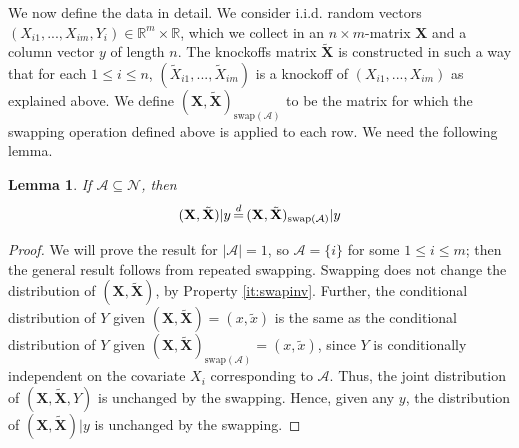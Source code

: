 \documentclass[11pt]{article}
\theoremstyle{plain}
\newtheorem{lemma}[theorem]{Lemma}
\theoremstyle{definition}
\newcommand{\reals}{\mathbb{R}}
\newcommand{\N}{\mathcal{N}}
\newcommand{\A}{\mathcal{A}}
\newcommand{\citt}{\citet}
\begin{document}
 We now define the data in detail. We consider i.i.d. random vectors $(X_{i1},...,X_{im}, Y_i)\in \reals^m\times\reals$, which we collect in an $n\times m$-matrix  $\mathbf{X}$ and a column vector $y$ of length $n$. The knockoffs matrix $\tilde{\mathbf{X}}$ is constructed in such a way that for each $1\leq i \leq n$, 
 $(\tilde{X}_{i1},...,\tilde{X}_{im})$ is a knockoff of $(X_{i1},...,X_{im})$ as explained above.
We define $(\mathbf{X}, \tilde{\mathbf{X}})_{\text{swap}(\A)}$ to be the matrix for which the swapping operation defined above is applied to each row. %
We need the following lemma.
 
 \begin{lemma}\label{lemmaswap}
 If $\A\subseteq\N$, then 
 $$(\mathbf{X}, {\tilde{\mathbf{X}}})|y   \,{\buildrel d \over =}\, (\mathbf{X}, {\tilde{\mathbf{X}}})_{\text{swap}(\A)}|y$$
 \end{lemma}
 \begin{proof}
 
 We will prove the result for $|\A|=1$, so $\A=\{i\}$ for some $1\leq i\leq m$; then the general result follows from repeated swapping.
 Swapping does not change the distribution of $(\mathbf{X}, {\tilde{\mathbf{X}}})$, by Property \eqref{it:swapinv}. Further, the conditional distribution of $Y$ given $(\mathbf{X}, {\tilde{\mathbf{X}}})=(x,\tilde{x})$ is
 the same as the conditional distribution of $Y$ given $(\mathbf{X}, {\tilde{\mathbf{X}}})_{\text{swap}(\A)}=(x,\tilde{x})$, since $Y$ is conditionally independent on the covariate $X_i$ corresponding to $\A$. Thus, the joint distribution of $(\mathbf{X}, {\tilde{\mathbf{X}}}, Y)$ is unchanged by the swapping. Hence, given any $y$, the distribution of $(\mathbf{X}, {\tilde{\mathbf{X}}})|y$ is unchanged by the swapping.
 \end{proof}
 
\end{document}
